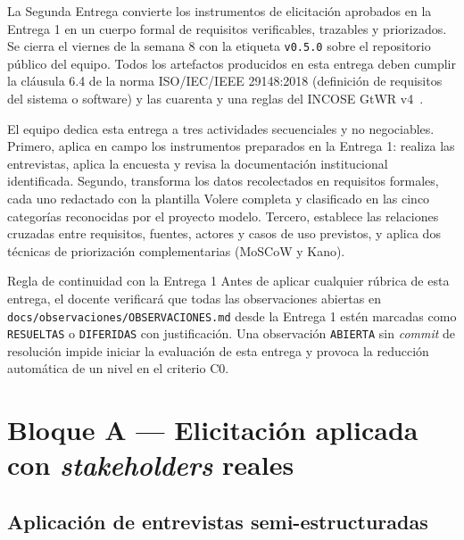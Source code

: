 \documentclass[11pt,a4paper]{article}
\begin{document}
La Segunda Entrega convierte los instrumentos de elicitaci\'on aprobados en la Entrega 1 en un cuerpo formal de requisitos verificables, trazables y priorizados. Se cierra el viernes de la semana 8 con la etiqueta \texttt{v0.5.0} sobre el repositorio p\'ublico del equipo. Todos los artefactos producidos en esta entrega deben cumplir la cl\'ausula 6.4 de la norma ISO/IEC/IEEE 29148:2018 (definici\'on de requisitos del sistema o software) y las cuarenta y una reglas del INCOSE GtWR v4~\cite{iso29148,incose2023requirements}.

El equipo dedica esta entrega a tres actividades secuenciales y no negociables. Primero, aplica en campo los instrumentos preparados en la Entrega 1: realiza las entrevistas, aplica la encuesta y revisa la documentaci\'on institucional identificada. Segundo, transforma los datos recolectados en requisitos formales, cada uno redactado con la plantilla Volere completa y clasificado en las cinco categor\'ias reconocidas por el proyecto modelo. Tercero, establece las relaciones cruzadas entre requisitos, fuentes, actores y casos de uso previstos, y aplica dos t\'ecnicas de priorizaci\'on complementarias (MoSCoW y Kano).

\begin{cajadefinicion}{Regla de continuidad con la Entrega 1}
Antes de aplicar cualquier r\'ubrica de esta entrega, el docente verificar\'a que todas las observaciones abiertas en \texttt{docs/observaciones/OBSERVACIONES.md} desde la Entrega 1 est\'en marcadas como \texttt{RESUELTAS} o \texttt{DIFERIDAS} con justificaci\'on. Una observaci\'on \texttt{ABIERTA} sin \emph{commit} de resoluci\'on impide iniciar la evaluaci\'on de esta entrega y provoca la reducci\'on autom\'atica de un nivel en el criterio C0.
\end{cajadefinicion}

\section{Bloque A --- Elicitaci\'on aplicada con \emph{stakeholders} reales}

\subsection{Aplicaci\'on de entrevistas semi-estructuradas}
\end{document}
